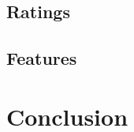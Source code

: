 \documentclass[conference]{IEEEtran}
\begin{document}
\subsection{Ratings}


\subsection{Features}



\section{Conclusion}






\end{document}
